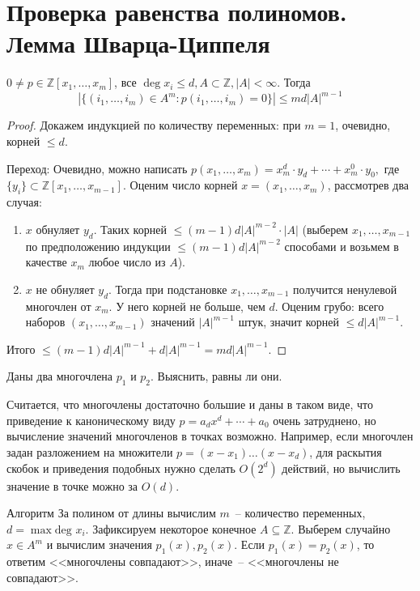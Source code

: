 \section{Проверка равенства полиномов. Лемма Шварца-Циппеля}

\secauthor{\ivan}
\begin{lemma*}
	$0\ne p\in\mathbb{Z}[x_1,\ldots,x_m]$, все $\deg x_i\le d, A\subset\mathbb{Z}, |A|<\infty$. Тогда $$\left|\{(i_1,\ldots,i_m)\in A^m\colon p(i_1,\ldots,i_m)=0\}\right|\le md|A|^{m-1}$$
\end{lemma*}
\begin{proof}
Докажем индукцией по количеству переменных: при $m=1$, очевидно, корней $\le d$.

Переход:
Очевидно, можно написать $p(x_1,\ldots,x_m)=x_m^d\cdot y_d+\cdots+x_m^0\cdot y_0,$ где $\{y_i\}\subset \mathbb Z[x_1,\ldots,x_{m-1}]$. Оценим число корней $x = (x_1, \ldots, x_m)$, рассмотрев два случая:
\begin{enumerate}
\item $x$ обнуляет $y_d$. Таких корней $\le (m-1)d|A|^{m-2} \cdot |A|$ (выберем $x_1,\ldots,x_{m-1}$ по предположению индукции $\le(m-1)d|A|^{m-2}$ способами и возьмем в качестве $x_m$ любое число из $A$).
\item $x$ не обнуляет $y_d$. Тогда при подстановке $x_1, \ldots, x_{m-1}$ получится ненулевой многочлен от $x_m$. У него корней не больше, чем $d$. Оценим грубо: всего наборов $(x_1, \ldots, x_{m-1})$ значений $|A|^{m-1}$ штук, значит корней $\le d|A|^{m-1}$.
\end{enumerate}

Итого $\le (m-1)d|A|^{m-1}+d|A|^{m-1}=md|A|^{m-1}.$
\end{proof}

\begin{problem*}
	Даны два многочлена $p_1$ и $p_2$. Выяснить, равны ли они.
\end{problem*}

Считается, что многочлены достаточно большие и даны в таком виде, что приведение к каноническому виду $p = a_d x^d + \cdots + a_0$ очень затруднено, но вычисление значений многочленов в точках возможно. Например, если многочлен задан разложением на множители $p = (x-x_1)\ldots(x-x_d)$, для раскытия скобок и приведения подобных нужно сделать $O(2^d)$ действий, но вычислить значение в точке можно за $O(d)$.

\begin{algodescription}{Алгоритм} За полином от длины вычислим $m$~-- количество переменных, $d = \max\text{deg } x_i$. Зафиксируем некоторое конечное $A \subseteq \mathbb Z$. Выберем случайно $x \in A^m$ и вычислим значения $p_1(x), p_2(x)$. Если $p_1(x) = p_2(x)$, то ответим <<многочлены совпадают>>, иначе~-- <<многочлены не совпадают>>.
\end{algodescription}

